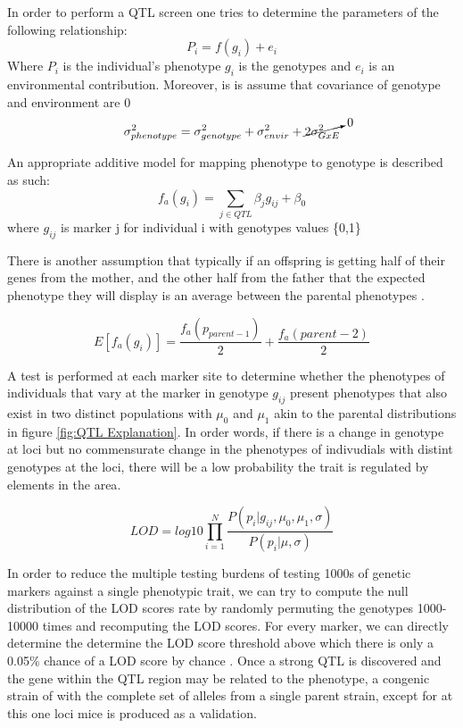 \documentclass[a4paper,11pt,twoside]{book}
\begin{document}
	In order to perform a QTL screen one tries to determine the parameters of the following relationship:
	$$P_i = f(g_i) + e_i $$
	Where $P_i$ is the individual's phenotype
	$g_i$ is the genotypes and $e_i$ is an environmental contribution.
	Moreover, is is assume that covariance of genotype and environment are 0 \citep{Broman2009AR/qtl}
	$$ \sigma_{phenotype}^2 = \sigma_{genotype}^2 + \sigma_{envir}^2 + \cancelto{0}{2{\sigma_{G x E}^2}} $$
	
	An appropriate additive model for mapping phenotype to genotype is described as such:
	$$ f_a(g_i) = \sum_{j \in QTL }\beta_jg_{ij} + \beta_0 $$
	where $g_{ij}$ is marker j for individual i with genotypes values \{0,1\} 
	
    There is another assumption that typically if an offspring is getting half of their genes from the mother, and the other half from the father that the expected phenotype they will display is an average between the parental phenotypes \citep{Broman2009AR/qtl}.
	
	$$ E[f_a(g_i)] = \dfrac{f_a(p_{parent-1})}{2} + \dfrac{f_a(parent-2)}{2}$$
	
    A test is performed at each marker site to determine whether the phenotypes of individuals that vary at the marker in genotype $g_{ij}$ present phenotypes that also exist in two distinct populations with $\mu_0$ and $\mu_1$ akin to the parental distributions in figure \ref{fig:QTL Explanation}. In order words, if there is a change in genotype at loci but no commensurate change in the phenotypes of indivudials with distint genotypes at the loci, there will be a low probability the trait is regulated by elements in the area\citep{Broman2009AR/qtl}.
	
	$$LOD = log10\prod_{i=1}^{N}\dfrac{P(p_i| g_{ij},\mu_0,\mu_1,\sigma )}{P(p_i|\mu,\sigma) } $$
	
    In order to reduce the multiple testing burdens of testing 1000s of genetic markers against a single phenotypic trait, we can try to compute the null distribution of the LOD scores rate by randomly permuting the genotypes 1000-10000 times and recomputing the LOD scores. For every marker, we can directly determine the determine the LOD score threshold above which there is only a 0.05\% chance of a LOD score by chance  \citep{Broman2009AR/qtl}. Once a strong QTL is discovered and the gene within the QTL region may be related to the phenotype, a congenic strain of with the complete set of alleles from a single parent strain, except for at this one loci mice is produced as a validation.
	
\end{document}
